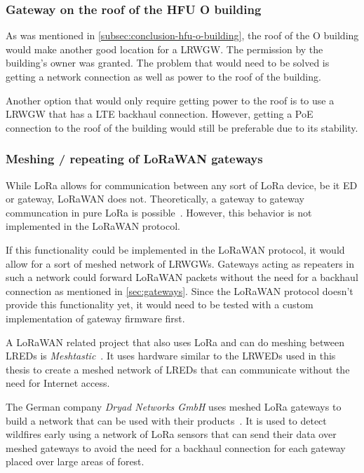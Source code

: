 \subsubsection{Gateway on the roof of the \acl{HFU} O building}

As was mentioned in \cref{subsec:conclusion-hfu-o-building}, the roof of the O building would make another good location for a \acl{LRWGW}.
The permission by the building's owner was granted.
The problem that would need to be solved is getting a network connection as well as power to the roof of the building.

Another option that would only require getting power to the roof is to use a \acl{LRWGW} that has a \ac{LTE} backhaul connection.
However, getting a \ac{PoE} connection to the roof of the building would still be preferable due to its stability.

\subsubsection{Meshing / repeating of \acs{LoRaWAN} gateways}

While \ac{LoRa} allows for communication between any sort of \ac{LoRa} device, be it \acl{ED} or gateway, \ac{LoRaWAN} does not.
Theoretically, a gateway to gateway communcation in pure \ac{LoRa} is possible~\cite{dwijaksara_multihop_2019}.
However, this behavior is not implemented in the \ac{LoRaWAN} protocol.

If this functionality could be implemented in the \ac{LoRaWAN} protocol, it would allow for a sort of meshed network of \aclp{LRWGW}.
Gateways acting as repeaters in such a network could forward \ac{LoRaWAN} packets without the need for a backhaul connection as mentioned in \cref{sec:gateways}.
Since the \ac{LoRaWAN} protocol doesn't provide this functionality yet, it would need to be tested with a custom implementation of gateway firmware first.

A \ac{LoRaWAN} related project that also uses \ac{LoRa} and can do meshing between \aclp{LRED} is \emph{Meshtastic}~\cite{meshtastic_llc_meshtastic_2023}.
It uses hardware similar to the \aclp{LRWED} used in this thesis to create a meshed network of \aclp{LRED} that can communicate without the need for Internet access.

The German company \emph{Dryad Networks GmbH} uses meshed \ac{LoRa} gateways to build a network that can be used with their products~\cite{dryad_networks_gmbh_silvanet_2023}.
It is used to detect wildfires early using a network of \ac{LoRa} sensors that can send their data over meshed gateways to avoid the need for a backhaul connection for each gateway placed over large areas of forest.

